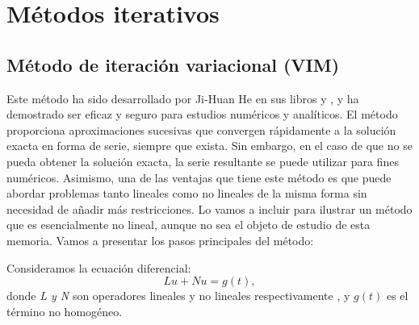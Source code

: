 \section{Métodos iterativos}

\subsection{Método de iteración variacional (VIM)}
Este método ha sido desarrollado por Ji-Huan He en sus libros \cite{VIM1} y \cite{VIM2}, y ha demostrado ser eficaz y seguro para estudios numéricos y analíticos. El método proporciona aproximaciones sucesivas que convergen rápidamente a la solución exacta en forma de serie, siempre que exista. Sin embargo, en el caso de que no se pueda obtener la solución exacta, la serie resultante se puede utilizar para fines numéricos. Asimismo, una de las ventajas que tiene este método es que puede abordar problemas tanto lineales como no lineales de la misma forma sin necesidad de añadir más restricciones. Lo vamos a incluir para ilustrar un método que es esencialmente no lineal, aunque no sea el objeto de estudio de esta memoria. Vamos a presentar los pasos principales del método:

Consideramos la ecuación diferencial:
\begin{equation}\label{eq:miv1}
	Lu + Nu = g(t),
\end{equation}
donde \textit{L y N} son operadores lineales y no lineales respectivamente , y $g(t)$ es el término no homogéneo.

